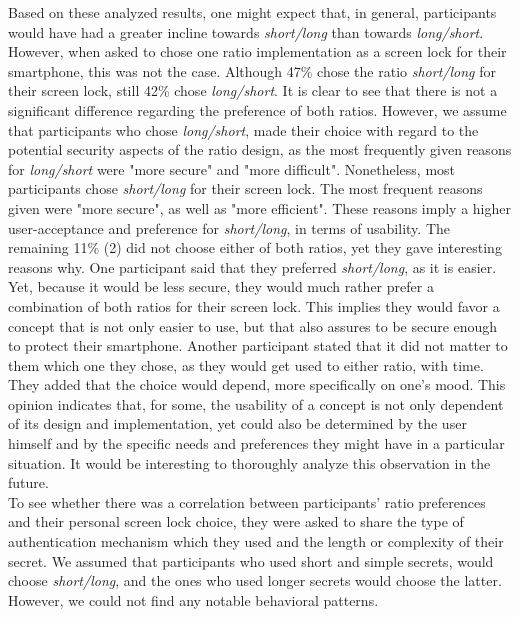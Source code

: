 Based on these analyzed results, one might expect that, in general,  participants would have had a greater incline towards \textit{short/long} than towards \textit{long/short}. However, when asked to chose one ratio implementation as a screen lock for their smartphone, this was not the case. Although 47\% chose the ratio \textit{short/long} for their screen lock, still 42\% chose \textit{long/short}. It is clear to see that there is not a significant difference regarding the preference of both ratios. However, we assume that participants who chose \textit{long/short}, made their choice with regard to the potential security aspects of the ratio design, as the most frequently given reasons for \textit{long/short} were "more secure" and "more difficult". Nonetheless, most participants chose \textit{short/long} for their screen lock. The most frequent reasons given were "more secure", as well as "more efficient". These reasons imply a higher user-acceptance and preference for \textit{short/long}, in terms of usability. The remaining 11\% (2) did not choose either of both ratios, yet they gave interesting reasons why. One participant said that they preferred \textit{short/long}, as it is easier. Yet, because it would be less secure, they would much rather prefer a combination of both ratios for their screen lock. This implies they would favor a concept that is not only easier to use, but that also assures to be secure enough to protect their smartphone. Another participant stated that it did not matter to them which one they chose, as they would get used to either ratio, with time. They added that the choice would depend, more specifically on one's mood. This opinion indicates that, for some, the usability of a concept is not only dependent of its design and implementation, yet could also be determined by the user himself and by the specific needs and preferences they might have in a particular situation. It would be interesting to thoroughly analyze this observation in the future.\\

To see whether there was a correlation between participants' ratio preferences and their personal screen lock choice, they were asked to share the type of authentication mechanism which they used and the length or complexity of their secret. We assumed that participants who used short and simple secrets, would choose \textit{short/long}, and the ones who used longer secrets would choose the latter. However, we could not find any notable behavioral patterns. \\

